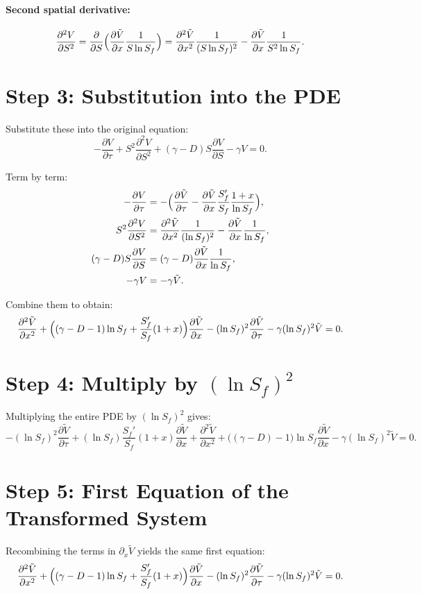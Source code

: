 \documentclass{article}
\begin{document}
\paragraph{Second spatial derivative:}
\[
\frac{\partial^2 V}{\partial S^2}
= \frac{\partial}{\partial S}
\Bigl(\frac{\partial \tilde V}{\partial x}\frac{1}{S \ln S_f}\Bigr)
= \frac{\partial^2 \tilde V}{\partial x^2}\frac{1}{(S \ln S_f)^2}
- \frac{\partial \tilde V}{\partial x}\frac{1}{S^2 \ln S_f}.
\]

\section*{Step 3: Substitution into the PDE}
Substitute these into the original equation:
\[
-\frac{\partial V}{\partial \tau}
+ S^2 \frac{\partial^2 V}{\partial S^2}
+ (\gamma - D) S \frac{\partial V}{\partial S}
- \gamma V = 0.
\]

Term by term:
\begin{align*}
-\frac{\partial V}{\partial \tau}
&= -\Bigl(\frac{\partial \tilde V}{\partial \tau}
- \frac{\partial \tilde V}{\partial x}\frac{S_f'}{S_f}\frac{1 + x}{\ln S_f}\Bigr), \\
S^2 \frac{\partial^2 V}{\partial S^2}
&= \frac{\partial^2 \tilde V}{\partial x^2}\frac{1}{(\ln S_f)^2}
- \frac{\partial \tilde V}{\partial x}\frac{1}{\ln S_f}, \\
(\gamma - D) S \frac{\partial V}{\partial S}
&= (\gamma - D) \frac{\partial \tilde V}{\partial x}\frac{1}{\ln S_f}, \\
-\gamma V
&= -\gamma \tilde V.
\end{align*}

Combine them to obtain:
\[
\frac{\partial^2 \tilde V}{\partial x^2}
+ \Bigl((\gamma - D - 1)\ln S_f + \frac{S_f'}{S_f}(1 + x)\Bigr)
\frac{\partial \tilde V}{\partial x}
- (\ln S_f)^2 \frac{\partial \tilde V}{\partial \tau}
- \gamma (\ln S_f)^2 \tilde V = 0.
\]

\section*{Step 4: Multiply by \((\ln S_f)^2\)}
Multiplying the entire PDE by \((\ln S_f)^2\) gives:
\[
-(\ln S_f)^2 \frac{\partial \tilde V}{\partial \tau}
+ (\ln S_f)\frac{S_f'}{S_f}(1 + x)\frac{\partial \tilde V}{\partial x}
+ \frac{\partial^2 \tilde V}{\partial x^2}
+ \bigl((\gamma - D) - 1\bigr)\ln S_f\frac{\partial \tilde V}{\partial x}
- \gamma (\ln S_f)^2 \tilde V = 0.
\]

\section*{Step 5: First Equation of the Transformed System}
Recombining the terms in \(\partial_x \tilde V\) yields the same first equation:
\[
\frac{\partial^2 \tilde V}{\partial x^2}
+ \Bigl((\gamma - D - 1)\ln S_f + \frac{S_f'}{S_f}(1 + x)\Bigr)
\frac{\partial \tilde V}{\partial x}
- (\ln S_f)^2 \frac{\partial \tilde V}{\partial \tau}
- \gamma (\ln S_f)^2 \tilde V = 0.
\]
\end{document}
